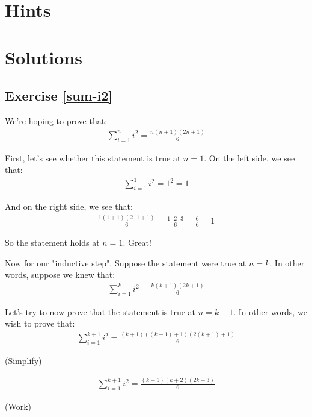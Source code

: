 \section{Hints}

\newpage
\section{Solutions}

\subsection{Exercise \ref{sum-i2}}


We're hoping to prove that:
\begin{align*}
\sum_{i=1}^{n} i^2 = \frac{n(n+1)(2n+1)}{6}
\end{align*}

First, let's see whether this statement is true at $n = 1$. On the left side, we see that:
\begin{align*}
\sum_{i=1}^{1} i^2 = 1^2 = 1
\end{align*}

And on the right side, we see that:
\begin{align*}
\frac{1(1+1)(2 \cdot 1+1)}{6} = \frac{1 \cdot 2 \cdot 3}{6} = \frac{6}{6} = 1
\end{align*}

So the statement holds at $n = 1$. Great!


Now for our "inductive step". Suppose the statement were true at $n = k$. In other words, suppose we knew that:
\begin{align*}
\sum_{i=1}^{k} i^2 = \frac{k(k+1)(2k+1)}{6}
\end{align*}

Let's try to now prove that the statement is true at $n = k + 1$. In other words, we wish to prove that:
\begin{align*}
\sum_{i=1}^{k+1} i^2 = \frac{(k+1)((k+1)+1)(2(k+1)+1)}{6}
\end{align*}

(Simplify)

\begin{align*}
\sum_{i=1}^{k+1} i^2 = \frac{(k+1)(k+2)(2k+3)}{6}
\end{align*}

(Work)

